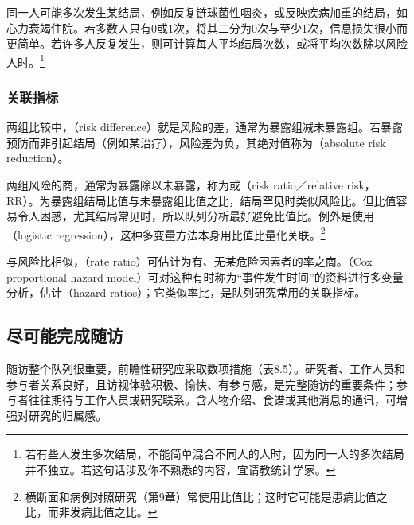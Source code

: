 同一人可能多次发生某结局，例如反复链球菌性咽炎，或反映疾病加重的结局，如心力衰竭住院。若多数人只有0或1次，将其二分为0次与至少1次，信息损失很小而更简单。若许多人反复发生，则可计算每人平均结局次数，或将平均次数除以风险人时。\footnote{若有些人发生多次结局，不能简单混合不同人的人时，因为同一人的多次结局并不独立。若这句话涉及你不熟悉的内容，宜请教统计学家。}

\subsubsection{关联指标}
两组比较中，（risk difference）就是风险的差，通常为暴露组减未暴露组。若暴露预防而非引起结局（例如某治疗），风险差为负，其绝对值称为（absolute risk reduction）。

两组风险的商，通常为暴露除以未暴露，称为或（risk ratio／relative risk，RR）。为暴露组结局比值与未暴露组比值之比，结局罕见时类似风险比。但比值容易令人困惑，尤其结局常见时，所以队列分析最好避免比值比。例外是使用（logistic regression），这种多变量方法本身用比值比量化关联。\footnote{横断面和病例对照研究（第9章）常使用比值比；这时它可能是患病比值之比，而非发病比值之比。}

与风险比相似，（rate ratio）可估计为有、无某危险因素者的率之商。（Cox proportional hazard model）可对这种有时称为“事件发生时间”的资料进行多变量分析，估计（hazard ratios）；它类似率比，是队列研究常用的关联指标。

\subsection{尽可能完成随访}
随访整个队列很重要，前瞻性研究应采取数项措施（表8.5）。研究者、工作人员和参与者关系良好，且访视体验积极、愉快、有参与感，是完整随访的重要条件；参与者往往期待与工作人员或研究联系。含人物介绍、食谱或其他消息的通讯，可增强对研究的归属感。


